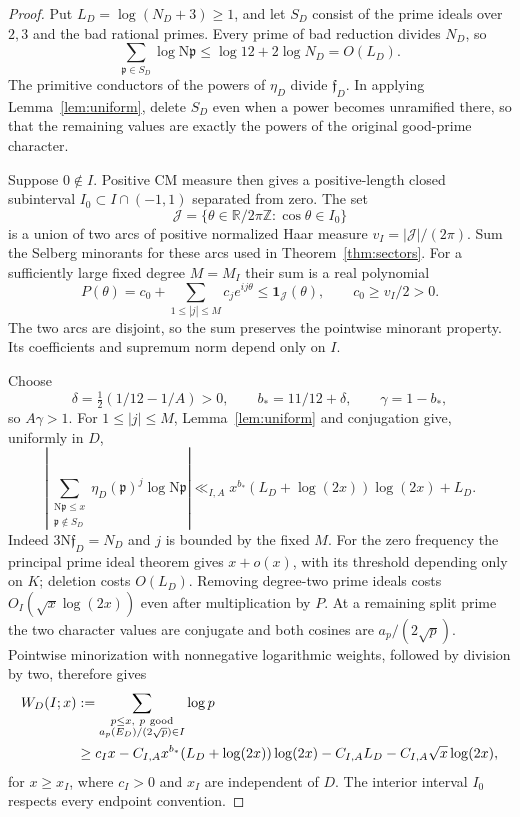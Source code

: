 \documentclass[11pt,a4paper]{article}
\numberwithin{equation}{section}
\theoremstyle{definition}
\theoremstyle{remark}
\newcommand{\R}{\mathbb R}
\newcommand{\Z}{\mathbb Z}
\newcommand{\N}{\mathrm N}
\newcommand{\ind}{\mathbf 1}
\begin{document}
\begin{proof}
Put $L_D=\log(N_D+3)\ge1$, and let $S_D$ consist of the prime ideals over $2,3$ and the bad rational primes. Every prime of bad reduction divides $N_D$, so
\[
 \sum_{\mathfrak p\in S_D}\log\N\mathfrak p
 \le\log12+2\log N_D=O(L_D).
\] The primitive conductors of the powers of $\eta_D$ divide $\mathfrak f_D$. In applying Lemma~\ref{lem:uniform}, delete $S_D$ even when a power becomes unramified there, so that the remaining values are exactly the powers of the original good-prime character.

Suppose $0\notin I$. Positive CM measure then gives a positive-length closed subinterval $I_0\subset I\cap(-1,1)$ separated from zero. The set
\[
 \mathcal J=\{\theta\in\R/2\pi\Z:\cos\theta\in I_0\}
\]
is a union of two arcs of positive normalized Haar measure $v_I=|\mathcal J|/(2\pi)$. Sum the Selberg minorants for these arcs used in Theorem~\ref{thm:sectors}. For a sufficiently large fixed degree $M=M_I$ their sum is a real polynomial
\[
 P(\theta)=c_0+\sum_{1\le|j|\le M}c_j e^{ij\theta}
 \le\ind_{\mathcal J}(\theta),\qquad c_0\ge v_I/2>0.
\]
The two arcs are disjoint, so the sum preserves the pointwise minorant property. Its coefficients and supremum norm depend only on $I$.

Choose
\[
 \delta=\tfrac12(1/12-1/A)>0,\qquad
 b_*=11/12+\delta,\qquad \gamma=1-b_*,
\]
so $A\gamma>1$. For $1\le|j|\le M$, Lemma~\ref{lem:uniform} and conjugation give, uniformly in $D$,
\[
 \left|\sum_{\substack{\N\mathfrak p\le x\\\mathfrak p\notin S_D}}
       \eta_D(\mathfrak p)^j\log\N\mathfrak p\right|
 \ll_{I,A}x^{b_*}(L_D+\log(2x))\log(2x)+L_D.
\]
Indeed $3\N\mathfrak f_D=N_D$ and $j$ is bounded by the fixed $M$. For the zero frequency the principal prime ideal theorem gives $x+o(x)$, with its threshold depending only on $K$; deletion costs $O(L_D)$. Removing degree-two prime ideals costs $O_I(\sqrt x\log(2x))$ even after multiplication by $P$. At a remaining split prime the two character values are conjugate and both cosines are $a_p/(2\sqrt p)$. Pointwise minorization with nonnegative logarithmic weights, followed by division by two, therefore gives
\begin{equation}\label{eq:leastminorant}
 \begin{split}
 W_D(I;x)&:=\sum_{\substack{p\le x,\ p\ {\rm good}\\
                  a_p(E_D)/(2\sqrt p)\in I}}\log p\\
 &\ge c_Ix-C_{I,A}x^{b_*}(L_D+\log(2x))\log(2x)
       -C_{I,A}L_D-C_{I,A}\sqrt x\log(2x),
 \end{split}
\end{equation}
for $x\ge x_I$, where $c_I>0$ and $x_I$ are independent of $D$. The interior interval $I_0$ respects every endpoint convention.


\end{proof}
\end{document}
